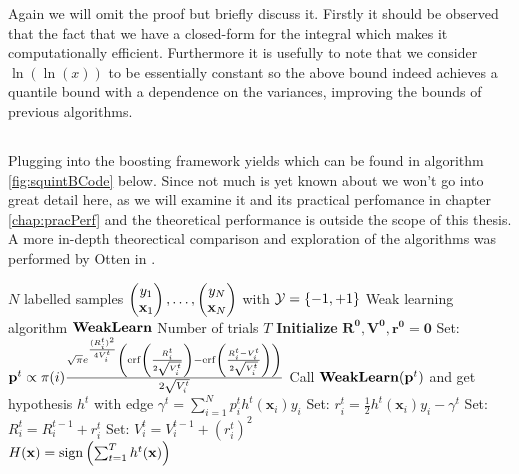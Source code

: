  Again we will omit the proof but briefly discuss it. Firstly it should be observed that the fact that we have a closed-form for the integral which makes it computationally efficient. Furthermore it is usefully to note that we consider $\ln(\ln(x))$ to be essentially constant so the above bound indeed achieves a quantile bound with a dependence on the variances, improving the bounds of previous algorithms.

\subsection{\squintB}
\label{subsec:algoSquintB}
Plugging \squint into the boosting framework yields \squintB which can be found in algorithm \ref{fig:squintBCode} below. Since not much is yet known about \squintB we won't go into great detail here, as we will examine it and its practical perfomance in chapter \ref{chap:pracPerf} and the theoretical performance is outside the scope of this thesis. A more in-depth theorectical comparison and exploration of the algorithms was performed by Otten in \cite{Otten2016}. 
\begin{algorithm} 
\caption{\NHB}
\label{fig:squintBCode}
\begin{algorithmic}[1]
\Require 
\Statex $N$ labelled samples $\Vec{y_1\\ \mathbf x_1},\ldots,\Vec{y_N\\ \mathbf x_N}$  with $\mathcal Y = \set{-1,+1}$ 
\Statex Weak learning algorithm $\weak$
\Statex Number of trials $T$
\Procedure{\squintB}{}
\State \textbf{Initialize} $\mathbf{R^0,V^0,r^0} = \mathbf 0$
\State Set: $\mathbf p^t \propto \pi(i) \frac{\sqrt{\pi}e^{\frac{(R^t_i)^2}{4V^t_i}}\lubke{\erf\lubke{\frac{R^t_i}{2\sqrt{V_i^t}}}-\erf\lubke{\frac{R_i^t-V_i^t}{2\sqrt{V_i^t}}}}}{2\sqrt{V_i^t}} $ 
\State Call $\weak(\mathbf p^t)$ and get hypothesis $h^t$ with edge $\gamma^t = \sum_{i=1}^N p^t_ih^t(\mathbf x_i)y_i$
\State Set: $r_i^t=\frac12h^t(\mathbf x_i)y_i-\gamma^t$ 
\State Set: $R_i^t = R_i^{t-1} + r_i^t $ 
\State Set: $V_i^t = V_i^{t-1} + (r_i^t)^2$
\EndFor\\
\Return $H(\mathbf x) = \sign\lubke{\sum^T_{t=1}h^t(\mathbf{x})}$
\EndProcedure
\end{algorithmic}
\end{algorithm}